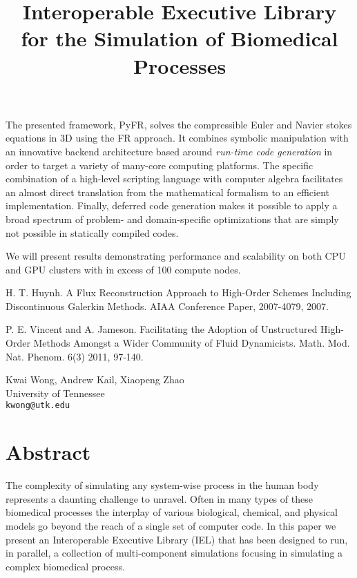 \documentclass[article,A4,11pt]{llncs}%
\begin{document}
The presented framework, PyFR, solves the compressible Euler and Navier stokes equations in 3D using the FR approach. It combines symbolic manipulation with an innovative backend architecture based around \emph{run-time code generation} in order to target a variety of many-core computing platforms. The specific combination of a high-level scripting language with computer algebra facilitates an almost direct translation from the mathematical formalism to an efficient implementation. Finally, deferred code generation makes it possible to apply a broad spectrum of problem- and domain-specific optimizations that are simply not possible in statically compiled codes.

We will present results demonstrating performance and scalability on both CPU and GPU clusters with in excess of 100 compute nodes.



\begin{thebibliography}{10}
{\sc H. T. Huynh}. {A Flux Reconstruction Approach to High-Order Schemes Including Discontinuous Galerkin Methods}. AIAA Conference Paper, 2007-4079, 2007.

{\sc P. E. Vincent and A. Jameson}. {Facilitating the Adoption of Unstructured High-Order Methods Amongst a Wider Community of Fluid Dynamicists}. Math. Mod. Nat. Phenom.  6(3) 2011, 97-140.
\end{thebibliography}

\title{Interoperable Executive Library for the Simulation of Biomedical Processes}
 \author{} \institute{}
\maketitle
\begin{center}
{\large Kwai Wong, Andrew Kail, Xiaopeng  Zhao}\\
University of Tennessee\\
{\tt kwong@utk.edu}
\end{center}

\section*{Abstract}
The complexity of simulating any system-wise process in the human body represents a daunting challenge to unravel. Often in many types of these biomedical processes the interplay of various biological, chemical, and physical models go beyond the reach of a single set of computer code. In this paper we present an Interoperable Executive Library (IEL) that has been designed to run, in parallel, a collection of multi-component simulations focusing in simulating a complex biomedical process. 
 
\end{document}

